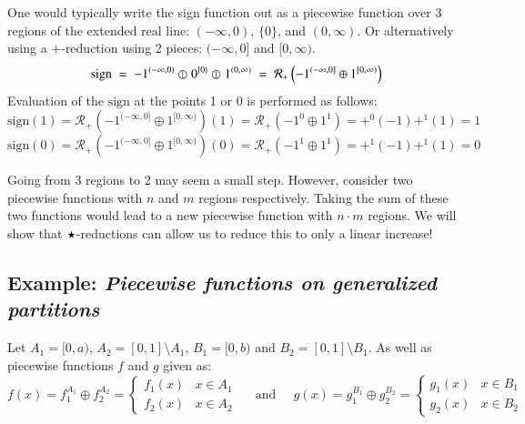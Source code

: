 One would typically write the sign function out as a piecewise function over 3 regions of the extended real line: 
$(-\infty, 0)$, $\{ 0 \}$, and $(0, \infty)$.
Or alternatively using a $+$-reduction using 2 pieces: $(-\infty, 0]$ and $[0, \infty)$.
\begin{equation}
	\text{sign} \;=\; -1^{(-\infty, 0)} \varobar^{} 0^{\{0\}} \varobar^{} 1^{(0, \infty)}
	\;=\; \mathcal{R}_+ \left( -1^{(-\infty, 0]} \oplus 1^{[0, \infty)} \right)
\end{equation}
Evaluation of the $\text{sign}$ at the points 1 or 0 is performed as follows:
\begin{equation*}
 \text{sign}(1) = \mathcal{R}_+ \left( -1^{(-\infty, 0]} \oplus 1^{[0, \infty)} \right)(1) 
 = \mathcal{R}_+ \left( -1^{0} \oplus 1^{1} \right)
 = +^0 (-1) +^1 (1) = 1
\end{equation*}
\begin{equation*}
 \text{sign}(0) = \mathcal{R}_+ \left( -1^{(-\infty, 0]} \oplus 1^{[0, \infty)} \right)(0) 
 = \mathcal{R}_+ \left( -1^{1} \oplus 1^{1} \right)
 = +^1 (-1) +^1 (1) = 0
\end{equation*}

Going from 3 regions to 2 may seem a small step.
However, consider two piecewise functions with $n$ and $m$ regions respectively.
Taking the sum of these two functions would lead to a new piecewise function with $n\cdot m$ regions.
We will show that $\star$-reductions can allow us to reduce this to only a linear increase!


\subsection{Example: \emph{Piecewise functions on generalized partitions}} 
Let $A_1 = [0,a)$, $A_2 = [0,1] \setminus A_1$, $B_1 = [0,b)$ and $B_2 = [0,1] \setminus B_1$.
As well as piecewise functions $f$ and $g$ given as:
\begin{equation*}
	f(x) = f_1^{A_1} \oplus f_2^{A_2}
		= \begin{cases}
			f_1(x) & x \in A_1 \\
			f_2(x) & x \in A_2
		\end{cases}
	\;\;\;\;\; \text{and} \;\;\;\;\;
	g(x) = g_1^{B_1} \oplus g_2^{B_2}
		= \begin{cases}
			g_1(x) & x \in B_1 \\
			g_2(x) & x \in B_2
		\end{cases}
\end{equation*}

